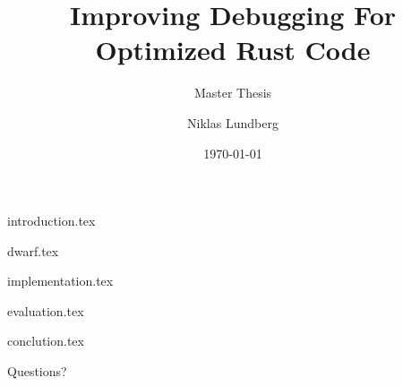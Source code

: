 \documentclass[aspectratio=169,xcolor=dvipsnames]{beamer}
\title[short title]{Improving Debugging For Optimized Rust Code}
\subtitle{Master Thesis}
\author[Niklas] {Niklas Lundberg}
\institute[LTU] %
{
    Department of Computer Science, Electrical and Space Engineering \\
    Luleå University of Technology
    \vskip 3pt
}
\date{\today} %
\begin{document}
\begin{frame}
    \titlepage
\end{frame}




{introduction.tex}


{dwarf.tex}


{implementation.tex}


{evaluation.tex}


{conclution.tex}




\begin{frame}
    \Huge{\centerline{Questions?}}
\end{frame}

\end{document}
